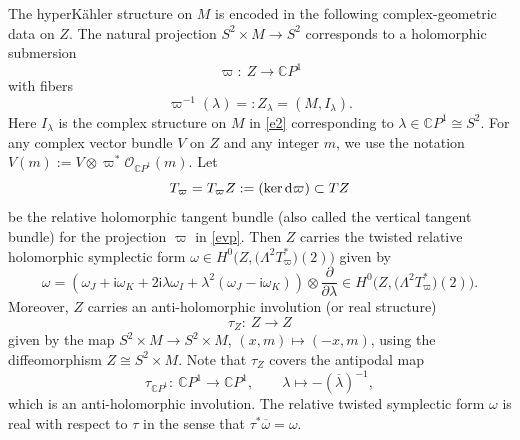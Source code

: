 \documentclass[pdftex]{sigma}
\numberwithin{equation}{section}
\theoremstyle{definition}
\newcommand\C{{\mathbb C}}
\renewcommand{\i}{\mathsf{i}}
\begin{document}
The hyperK\"ahler structure on $M$ is encoded in the following complex-geometric data on $Z$.
The natural projection $S^2 \times M \longrightarrow S^2$ corresponds to a holomorphic submersion
\begin{equation}\label{evp}
\varpi \colon\ Z \longrightarrow \C P^1
\end{equation}
with fibers
\begin{equation}\label{zl}
\varpi^{-1}(\lambda) =: Z_\lambda = (M, I_\lambda) .
\end{equation}
Here $I_\lambda$ is the complex structure on $M$ in \eqref{e2} corresponding to $\lambda \in \C P^1 \cong S^2$.
For any complex vector bundle $V$ on $Z$ and any integer $m$, we use the notation $V(m) := V \otimes \varpi^*\mathcal{O}_{\C P^1}(m)$.
Let
\[T_\varpi = T_\varpi Z := (\ker {\rm d}\varpi) \subset TZ\]
be the relative holomorphic tangent bundle (also called
the vertical tangent bundle) for the projection $\varpi$ in \eqref{evp}.
Then $Z$ carries the twisted relative holomorphic symplectic form
$\omega \in H^0\bigl(Z, \bigl(\Lambda^2 T_{\varpi}^*\bigr)(2)\bigr)$ given by
\begin{equation}\label{t6}
\omega = \left(\omega_J+\i \omega_K + 2\i \lambda\omega_I +
\lambda^2(\omega_J-\i\omega_K)\right)\otimes\frac{\partial}{\partial \lambda} \in
H^0\bigl(Z, \bigl(\Lambda^2T_\varpi^*\bigr)(2)\bigr) .
\end{equation}
Moreover, $Z$ carries an anti-holomorphic involution (or real structure)
\begin{equation}\label{etz}
\tau_Z \colon\ Z \longrightarrow Z
\end{equation}
given by the map $S^2 \times M \longrightarrow S^2 \times M$, $ (x, m) \longmapsto (-x, m)$,
using the diffeomorphism $Z \cong S^2\times M$. Note that $\tau_Z$ covers the antipodal map
\begin{equation}\label{tcp}
\tau_{\C P^1}\colon\ \C P^1 \longrightarrow \C P^1, \qquad \lambda \longmapsto -(\overline{\lambda})^{-1},
\end{equation}
which is an anti-holomorphic involution.
The relative twisted symplectic form $\omega$ is real with respect to $\tau$ in the sense that $\tau^*\overline\omega
 = \omega$.
\end{document}
